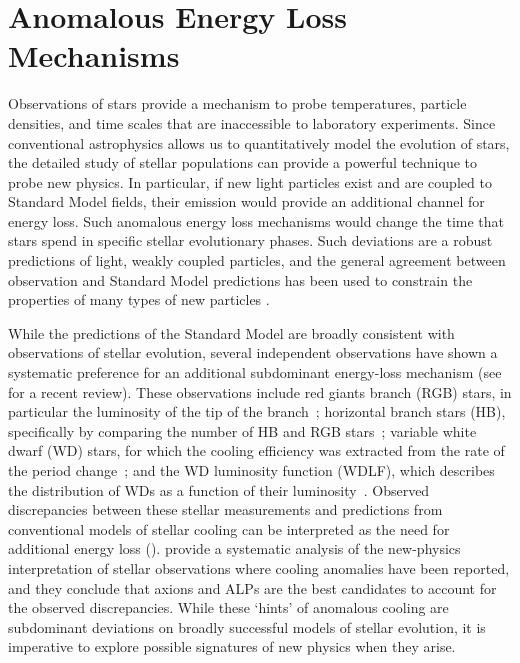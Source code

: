 \section{Anomalous Energy Loss Mechanisms}
\label{sec:cooling}


Observations of stars provide a mechanism to probe temperatures, particle densities, and time scales that are inaccessible to laboratory experiments.
Since conventional astrophysics allows us to quantitatively model the evolution of stars, the detailed study of stellar populations can provide a powerful technique to probe new physics.
In particular, if new light particles exist and are coupled to Standard Model fields, their emission would provide an additional channel for energy loss. 
Such anomalous energy loss mechanisms would change the time that stars spend in specific stellar evolutionary phases.
Such deviations are a robust predictions of light, weakly coupled particles, and the general agreement between observation and Standard Model predictions has been used to constrain the properties of many types of new particles \citep{hep-ph/0611350, 1210.1271, 1302.3884, 1305.2920, 1611.03864, 1611.05852, 1803.00993}.

While the predictions of the Standard Model are broadly consistent with observations of stellar evolution, several independent observations have shown a systematic preference for an additional subdominant energy-loss mechanism (see \citealt{Giannotti:2017hny} for a recent review).
These observations include red giants branch (RGB) stars, in particular the luminosity of the tip of the branch~\citep{Viaux:2013lha,Viaux:2013hca}; 
horizontal branch stars (HB), specifically by comparing the number of HB and RGB stars~\citep{Ayala:2014,Straniero:2015nvc};
variable white dwarf (WD) stars, for which the cooling efficiency was extracted from the rate of the period change~\citep{KeplerEtAl,Isern:1992gia,BischoffKim:2007ve,Corsico:2012ki,Corsico:2012sh,Corsico:2014mpa,Corsico:2016okh,Battich:2016htm}; 
and the WD luminosity function (WDLF), which describes the distribution of WDs as a function of their luminosity~\citep{Isern:2008nt,Bertolami:2014wua,Isern:2018uce}.
Observed discrepancies between these stellar measurements and predictions from conventional models of stellar cooling can be interpreted as the need for additional energy loss ().
\cite{Giannotti:2015kwo} provide a systematic analysis of the new-physics interpretation of stellar observations  where cooling anomalies have been reported, and they conclude that axions and ALPs are the best candidates to account for the observed discrepancies. 
While these `hints' of anomalous cooling are subdominant deviations on broadly successful models of stellar evolution, it is imperative to explore possible signatures of new physics when they arise.

